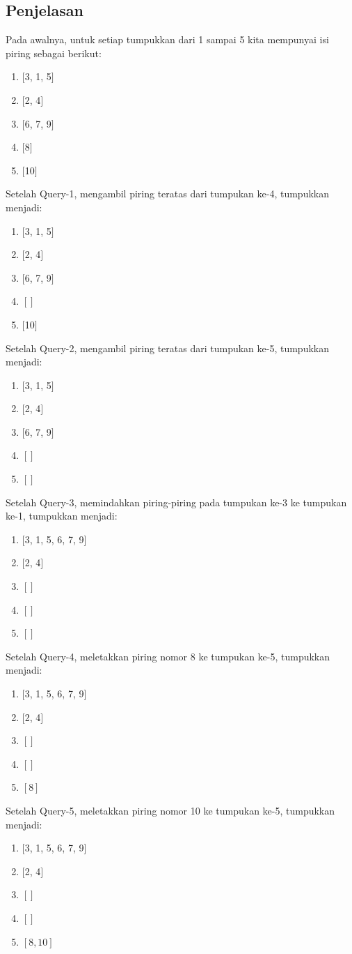 \documentclass{article}
\begin{document}
\subsection*{Penjelasan}
Pada awalnya, untuk setiap tumpukkan dari 1 sampai 5 kita mempunyai isi piring sebagai berikut:
\begin{enumerate}
\item $[$3, 1, 5$]$
\item $[$2, 4$]$
\item $[$6, 7, 9$]$
\item $[$8$]$
\item $[$10$]$
\end{enumerate}
Setelah Query-1, mengambil piring teratas dari tumpukan ke-4, tumpukkan menjadi:
\begin{enumerate}
\item $[$3, 1, 5$]$
\item $[$2, 4$]$
\item $[$6, 7, 9$]$
\item $[]$
\item $[$10$]$
\end{enumerate}
Setelah Query-2, mengambil piring teratas dari tumpukan ke-5, tumpukkan menjadi:
\begin{enumerate}
\item $[$3, 1, 5$]$
\item $[$2, 4$]$
\item $[$6, 7, 9$]$
\item $[]$
\item $[]$
\end{enumerate}
Setelah Query-3, memindahkan piring-piring pada tumpukan ke-3 ke tumpukan ke-1, tumpukkan menjadi:
\begin{enumerate}
\item $[$3, 1, 5, 6, 7, 9$]$
\item $[$2, 4$]$
\item $[]$
\item $[]$
\item $[]$
\end{enumerate}
Setelah Query-4, meletakkan piring nomor 8 ke tumpukan ke-5, tumpukkan menjadi:
\begin{enumerate}
\item $[$3, 1, 5, 6, 7, 9$]$
\item $[$2, 4$]$
\item $[]$
\item $[]$
\item $[8]$
\end{enumerate}
Setelah Query-5, meletakkan piring nomor 10 ke tumpukan ke-5, tumpukkan menjadi:
\begin{enumerate}
\item $[$3, 1, 5, 6, 7, 9$]$
\item $[$2, 4$]$
\item $[]$
\item $[]$
\item $[8, 10]$
\end{enumerate}
\end{document}
